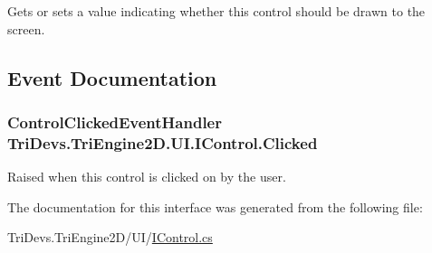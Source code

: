 Gets or sets a value indicating whether this control should be drawn to the screen. 



\subsection{Event Documentation}
\hypertarget{interface_tri_devs_1_1_tri_engine2_d_1_1_u_i_1_1_i_control_a769d812172bdfb85b0d605b843be9593}{
\subsubsection[{Clicked}]{\setlength{\rightskip}{0pt plus 5cm}Control\-Clicked\-Event\-Handler Tri\-Devs.\-Tri\-Engine2\-D.\-U\-I.\-I\-Control.\-Clicked}}\label{interface_tri_devs_1_1_tri_engine2_d_1_1_u_i_1_1_i_control_a769d812172bdfb85b0d605b843be9593}


Raised when this control is clicked on by the user. 



The documentation for this interface was generated from the following file\-:\begin{DoxyCompactItemize}
\item 
Tri\-Devs.\-Tri\-Engine2\-D/\-U\-I/\hyperlink{_i_control_8cs}{I\-Control.\-cs}\end{DoxyCompactItemize}
